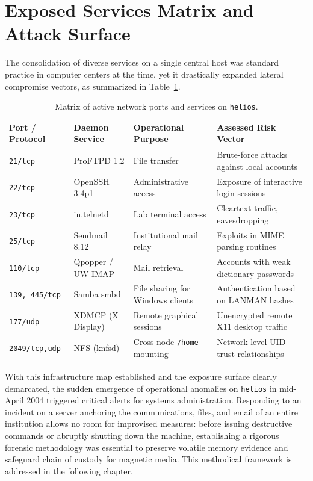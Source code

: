 \section{Exposed Services Matrix and Attack Surface}

The consolidation of diverse services on a single central host was standard practice in computer centers at the time, yet it drastically expanded lateral compromise vectors, as summarized in Table~\ref{tab:servicios_expuestos}.

\begin{table}[htbp]
\centering
\small
\begin{tabularx}{\textwidth}{@{} l l X X @{}}
\toprule
\textbf{Port / Protocol} & \textbf{Daemon Service} & \textbf{Operational Purpose} & \textbf{Assessed Risk Vector} \\
\midrule
\texttt{21/tcp} & ProFTPD 1.2 & File transfer & Brute-force attacks against local accounts \\
\texttt{22/tcp} & OpenSSH 3.4p1 & Administrative access & Exposure of interactive login sessions \\
\texttt{23/tcp} & in.telnetd & Lab terminal access & Cleartext traffic, eavesdropping \\
\texttt{25/tcp} & Sendmail 8.12 & Institutional mail relay & Exploits in MIME parsing routines \\
\texttt{110/tcp} & Qpopper / UW-IMAP & Mail retrieval & Accounts with weak dictionary passwords \\
\texttt{139, 445/tcp} & Samba smbd & File sharing for Windows clients & Authentication based on LANMAN hashes \\
\texttt{177/udp} & XDMCP (X Display) & Remote graphical sessions & Unencrypted remote X11 desktop traffic \\
\texttt{2049/tcp,udp} & NFS (knfsd) & Cross-node \texttt{/home} mounting & Network-level UID trust relationships \\
\bottomrule
\end{tabularx}
\caption{Matrix of active network ports and services on \texttt{helios}.}
\label{tab:servicios_expuestos}
\end{table}

With this infrastructure map established and the exposure surface clearly demarcated, the sudden emergence of operational anomalies on \texttt{helios} in mid-April 2004 triggered critical alerts for systems administration. Responding to an incident on a server anchoring the communications, files, and email of an entire institution allows no room for improvised measures: before issuing destructive commands or abruptly shutting down the machine, establishing a rigorous forensic methodology was essential to preserve volatile memory evidence and safeguard chain of custody for magnetic media. This methodical framework is addressed in the following chapter.

